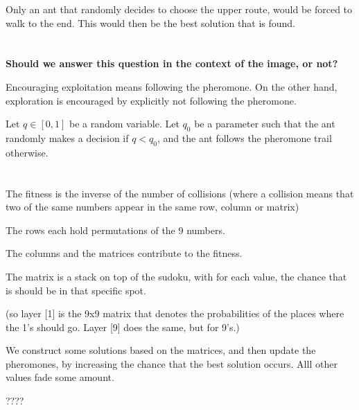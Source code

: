 \documentclass[11pt]{article}
\begin{document}
Only an ant that randomly decides to choose the upper route, would be forced to walk to the end. This would then be the best solution that is found. 

\section{}
\textbf{Should we answer this question in the context of the image, or not?}

Encouraging exploitation means following the pheromone. On the other hand, exploration is encouraged by explicitly not following the pheromone. 

Let $q \in [0,1]$ be a random variable. Let $q_0$ be a parameter such that the ant randomly makes a decision if $q < q_0$, and the ant follows the pheromone trail otherwise.



\section{}

The fitness is the inverse of the number of collisions (where a collision means that two of the same numbers appear in the same row, column or matrix)

The rows each hold permutations of the 9 numbers. 

The columns and the matrices contribute to the fitness.

The matrix is a stack on top of the sudoku, with for each value, the chance that is should be in that specific spot.

(so layer [1] is the 9x9 matrix that denotes the probabilities of the places where the 1's should go. Layer [9] does the same, but for 9's.)

We construct some solutions based on the matrices, and then update the pheromones, by increasing the chance that the best solution occurs. Alll other values fade some amount.

????
\end{document}
